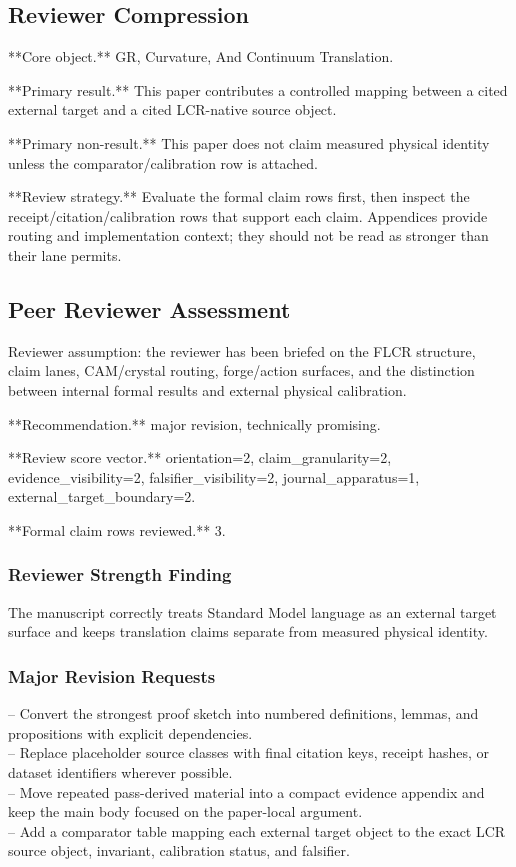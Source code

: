\documentclass[11pt]{article}
\begin{document}
\subsection*{Reviewer Compression}

**Core object.** GR, Curvature, And Continuum Translation.

**Primary result.** This paper contributes a controlled mapping between a cited external target and a cited LCR-native source object.

**Primary non-result.** This paper does not claim measured physical identity unless the comparator/calibration row is attached.

**Review strategy.** Evaluate the formal claim rows first, then inspect the receipt/citation/calibration rows that support each claim. Appendices provide routing and implementation context; they should not be read as stronger than their lane permits.

\subsection*{Peer Reviewer Assessment}

Reviewer assumption: the reviewer has been briefed on the FLCR structure, claim lanes, CAM/crystal routing, forge/action surfaces, and the distinction between internal formal results and external physical calibration.

**Recommendation.** major revision, technically promising.

**Review score vector.** orientation=2, claim\_granularity=2, evidence\_visibility=2, falsifier\_visibility=2, journal\_apparatus=1, external\_target\_boundary=2.

**Formal claim rows reviewed.** 3.

\subsubsection*{Reviewer Strength Finding}

The manuscript correctly treats Standard Model language as an external target surface and keeps translation claims separate from measured physical identity.

\subsubsection*{Major Revision Requests}

\noindent{}-- Convert the strongest proof sketch into numbered definitions, lemmas, and propositions with explicit dependencies.\\
\noindent{}-- Replace placeholder source classes with final citation keys, receipt hashes, or dataset identifiers wherever possible.\\
\noindent{}-- Move repeated pass-derived material into a compact evidence appendix and keep the main body focused on the paper-local argument.\\
\noindent{}-- Add a comparator table mapping each external target object to the exact LCR source object, invariant, calibration status, and falsifier.\\
\end{document}
